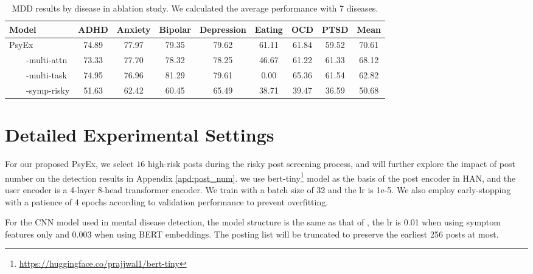 \begin{table}[h]
    \centering
    \begin{tabular}{l|ccccccc|c}
    \hline
    Model &  ADHD & Anxiety & Bipolar & Depression & Eating & OCD & PTSD & Mean \\ 
    \hline
    PsyEx  & 74.89&    77.97&	79.35&	79.62&	61.11 &	61.84&	59.52&	70.61 \\ 
     ~~~~-multi-attn & 73.33&	77.70&	78.32&	78.25&	46.67&	61.22&	61.33&	68.12 \\
     ~~~~-multi-task  & 74.95&	76.96&	81.29&	79.61&	0.00 &	65.36&	61.54&	62.82  \\
     ~~~~-symp-risky  & 51.63 & 62.42 & 60.45 & 65.49 & 38.71 & 39.47 & 36.59 & 50.68 \\
    \hline
    \end{tabular}
    \caption{MDD results by disease in ablation study. We calculated the average performance with 7 diseases.}
    \label{tab:mdd_by_disease}
\end{table}

\section{Detailed Experimental Settings}
\label{apd:settings}

For our proposed PsyEx, we select $16$ high-risk posts during the risky post screening process, and will further explore the impact of post number on the detection results in Appendix \ref{apd:post_num}.
we use bert-tiny\footnote{\url{https://huggingface.co/prajjwal1/bert-tiny}} model as the basis of the post encoder in HAN, and the user encoder is a 4-layer 8-head transformer encoder. We train with a batch size of 32 and the lr is 1e-5. We also employ early-stopping with a patience of 4 epochs according to validation performance to prevent overfitting. 

For the CNN model used in mental disease detection, the model structure is the same as that of \citet{nguyen2022improving}, the lr is 0.01 when using symptom features only and 0.003 when using BERT embeddings. The posting list will be truncated to preserve the earliest 256 posts at most. 

